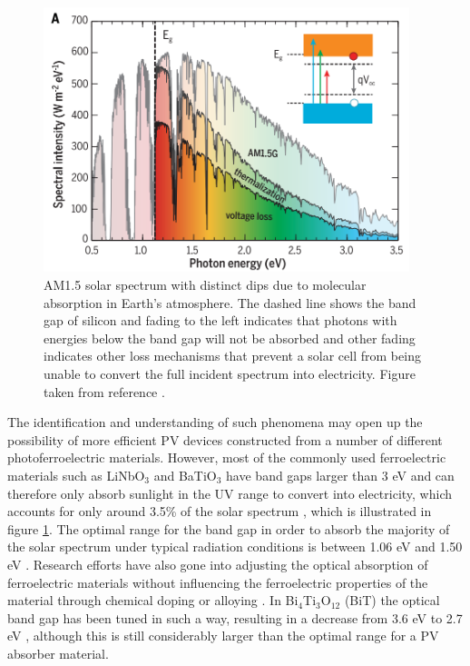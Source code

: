 \begin{figure}[h!]
  \centering
    \includegraphics[width=0.95\textwidth]{figures/solar_spectrum2.png}
    \caption{AM1.5 solar spectrum with distinct dips due to molecular absorption in Earth’s atmosphere. The dashed line shows the band gap of silicon and fading to the left indicates that photons with energies below the band gap will not be absorbed and other fading indicates other loss mechanisms that prevent a solar cell from being unable to convert the full incident spectrum into electricity. Figure taken from reference .}
  \label{solar_spectrum}
\end{figure}

The identification and understanding of such phenomena may open up the possibility of more efficient PV devices constructed from a number of different photoferroelectric materials. However, most of the commonly used ferroelectric materials such as LiNbO$_3$ and BaTiO$_3$ have band gaps larger than 3 eV and can therefore only absorb sunlight in the UV range to convert into electricity, which accounts for only around 3.5\% of the solar spectrum \cite{FE_PV_rev1}, which is illustrated in figure \ref{solar_spectrum}. The optimal range for the band gap in order to absorb the majority of the solar spectrum under typical radiation conditions is between 1.06 eV and 1.50 eV \cite{CZTS_book}. Research efforts have also gone into adjusting the optical absorption of ferroelectric materials without influencing the ferroelectric properties of the material through chemical doping or alloying \cite{FE_PV_rev1}. In Bi$_4$Ti$_3$O$_{12}$ (BiT) the optical band gap has been tuned in such a way, resulting in a decrease from 3.6 eV to 2.7 eV \cite{FE_PV_rev1_83}, although this is still considerably larger than the optimal range for a PV absorber material.\\

